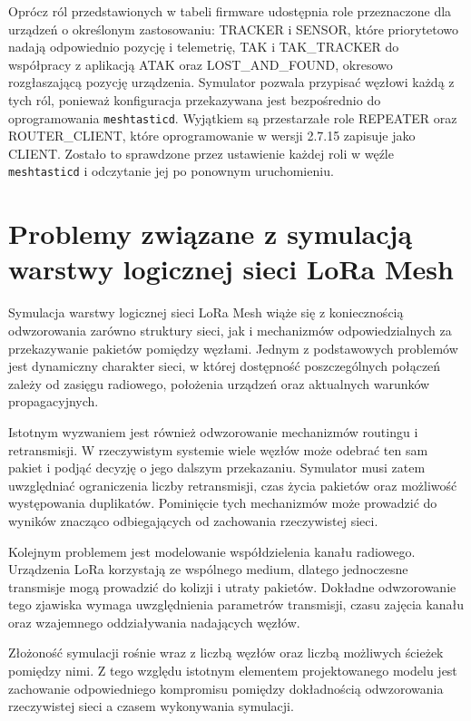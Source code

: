 \documentclass[12pt,a4paper,twoside]{report}
\theoremstyle{definition} %
\begin{document}
Oprócz ról przedstawionych w tabeli firmware udostępnia role przeznaczone dla urządzeń o określonym zastosowaniu: TRACKER i SENSOR, które priorytetowo nadają odpowiednio pozycję i telemetrię, TAK i TAK\_TRACKER do współpracy z aplikacją ATAK oraz LOST\_AND\_FOUND, okresowo rozgłaszającą pozycję urządzenia. Symulator pozwala przypisać węzłowi każdą z tych ról, ponieważ konfiguracja przekazywana jest bezpośrednio do oprogramowania \texttt{meshtasticd}. Wyjątkiem są przestarzałe role REPEATER oraz ROUTER\_CLIENT, które oprogramowanie w wersji 2.7.15 zapisuje jako CLIENT. Zostało to sprawdzone przez ustawienie każdej roli w węźle \texttt{meshtasticd} i odczytanie jej po ponownym uruchomieniu.

\section{Problemy związane z symulacją warstwy logicznej sieci LoRa Mesh}

Symulacja warstwy logicznej sieci LoRa Mesh wiąże się z koniecznością odwzorowania zarówno struktury sieci, jak i mechanizmów odpowiedzialnych za przekazywanie pakietów pomiędzy węzłami. Jednym z podstawowych problemów jest dynamiczny charakter sieci, w której dostępność poszczególnych połączeń zależy od zasięgu radiowego, położenia urządzeń oraz aktualnych warunków propagacyjnych.

Istotnym wyzwaniem jest również odwzorowanie mechanizmów routingu i retransmisji. W rzeczywistym systemie wiele węzłów może odebrać ten sam pakiet i podjąć decyzję o jego dalszym przekazaniu. Symulator musi zatem uwzględniać ograniczenia liczby retransmisji, czas życia pakietów oraz możliwość występowania duplikatów. Pominięcie tych mechanizmów może prowadzić do wyników znacząco odbiegających od zachowania rzeczywistej sieci.

Kolejnym problemem jest modelowanie współdzielenia kanału radiowego. Urządzenia LoRa korzystają ze wspólnego medium, dlatego jednoczesne transmisje mogą prowadzić do kolizji i utraty pakietów. Dokładne odwzorowanie tego zjawiska wymaga uwzględnienia parametrów transmisji, czasu zajęcia kanału oraz wzajemnego oddziaływania nadających węzłów.

Złożoność symulacji rośnie wraz z liczbą węzłów oraz liczbą możliwych ścieżek pomiędzy nimi. Z tego względu istotnym elementem projektowanego modelu jest zachowanie odpowiedniego kompromisu pomiędzy dokładnością odwzorowania rzeczywistej sieci a czasem wykonywania symulacji.
\end{document}
